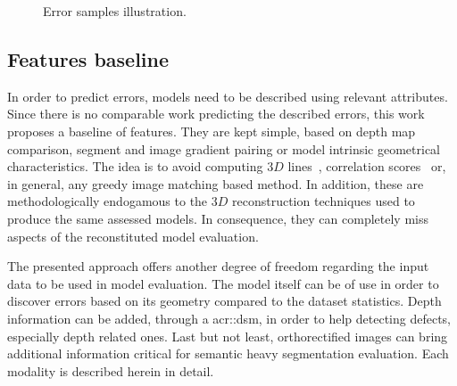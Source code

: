 \documentclass[runningheads]{llncs}
\newcounter{SubFigCounter}
\begin{document}
\begin{figure}
\begin{center}
{{                    \label{fig::fac_err}
                    \addtocounter{figure}{-1}
                }
            }
            {
                \caption{\label{fig::samples}Error samples illustration.}
            }
        \end{center}
        \vspace{-4.5em}
    \end{figure}

\subsection{Features baseline}
In order to predict errors, models need to be described using relevant attributes. Since there is no comparable work predicting the described errors, this work proposes a baseline of features. They are kept simple, based on depth map comparison, segment and image gradient pairing or model intrinsic geometrical characteristics. The idea is to avoid computing $3D$ lines~\cite{Michelin2013}, correlation scores~\cite{boudet2006supervised} or, in general, any greedy image matching based method. In addition, these are methodologically endogamous to the $3D$ reconstruction techniques used to produce the same assessed models. In consequence, they can completely miss aspects of the reconstituted model evaluation.

The presented approach offers another degree of freedom regarding the input data to be used in model evaluation. The model itself can be of use in order to discover errors based on its geometry compared to the dataset statistics. Depth information can be added, through a \acrshort{acr::dsm}, in order to help detecting defects, especially depth related ones. Last but not least, orthorectified images can bring additional information critical for semantic heavy segmentation evaluation. Each modality is described herein in detail.
\end{document}
